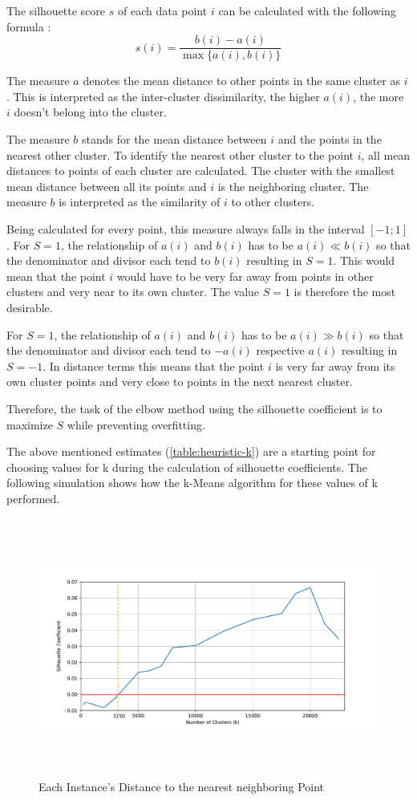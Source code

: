 The silhouette score $s$ of each data point $i$ can be calculated with the following formula \cite{kodinariyaReviewDeterminingCluster2013}:
\[ s(i) = \frac{b(i) - a(i)}{\max\{a(i),b(i)\}} \]

The measure $a$ denotes the mean distance to other points in the same cluster as $i$. This is interpreted as the inter-cluster dissimilarity, the higher $a(i)$, the more $i$ doesn't belong into the cluster.

The measure $b$ stands for the mean distance between $i$ and the points in the nearest other cluster. To identify the nearest other cluster to the point $i$, all mean distances to points of each cluster are calculated. The cluster with the smallest mean distance between all its points and $i$ is the neighboring cluster. The measure $b$ is interpreted as the similarity of $i$ to other clusters.

Being calculated for every point, this measure always falls in the interval $[-1;1]$. For $S = 1$, the relationship of $a(i)$ and $b(i)$ has to be $a(i) \ll b(i)$ so that the denominator and divisor each tend to $b(i)$ resulting in $S = 1$. This would mean that the point $i$ would have to be very far away from points in other clusters and very near to its own cluster. The value $S = 1$ is therefore the most desirable.

For $S = 1$, the relationship of $a(i)$ and $b(i)$ has to be $a(i) \gg b(i)$ so that the denominator and divisor each tend to $-a(i)$ respective $a(i)$ resulting in $S = -1$. In distance terms this means that the point $i$ is very far away from its own cluster points and very close to points in the next nearest cluster.

Therefore, the task of the elbow method using the silhouette coefficient is to maximize $S$ while preventing overfitting.

The above mentioned estimates (\ref{table:heuristic-k}) are a starting point for choosing values for k during the calculation of silhouette coefficients. The following simulation shows how the k-Means algorithm for these values of k performed.

 \begin{figure}[!h]
	\centering
	\includegraphics[height=8.5cm]{Bilder/models/elbow.pdf}
	\caption{Each Instance's Distance to the nearest neighboring Point}
	\label{fig:silhouette}
\end{figure}

